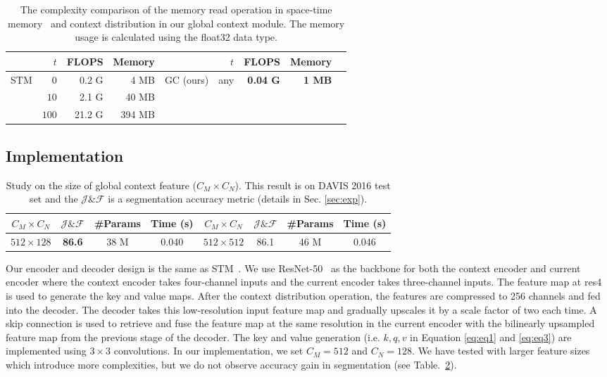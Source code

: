 \documentclass[runningheads]{llncs}
\begin{document}
\begin{table}[tb]
    \centering
    \caption{The complexity comparison of the memory read operation in space-time memory~\cite{stm} and context distribution in our global context module. The memory usage is calculated using the float32 data type.}
    \label{tab:complexity}
     \setlength{\tabcolsep}{6pt}
    \begin{tabular}{crrr|crrrr}
        \toprule
            & $t$ & FLOPS & Memory& & $t$ & FLOPS & Memory\\ 
        \midrule
        STM & $0$ & 0.2 G & 4 MB & GC (ours) & any & \textbf{0.04 G} & \textbf{1 MB} \\
         & $10$ & 2.1 G & 40 MB \\
         & $100$ & 21.2 G & 394 MB \\ 
        \bottomrule
    \end{tabular}
\end{table}

\subsection{Implementation}

\begin{table}[tb]
    \centering
    \caption{Study on the size of global context feature ($C_M \times C_N$). This result is on DAVIS 2016 test set and the $\mathcal{J} \& \mathcal{F}$ is a segmentation accuracy metric (details in Sec. \ref{sec:exp}).}
    \label{tab:ablation}
    \setlength{\tabcolsep}{3pt}
    \begin{tabular}{cccc|cccc}
        \toprule
        $C_M \times C_N$ & $\mathcal{J} \& \mathcal{F}$ & \#Params & Time (s) & $C_M \times C_N$ & $\mathcal{J} \& \mathcal{F}$ & \#Params & Time (s)\\ \midrule
        $512 \times 128$ & \textbf{86.6} & 38 M & 0.040 & $512 \times 512$ & 86.1 & 46 M & 0.046 \\ \bottomrule
    \end{tabular}
\end{table}

Our encoder and decoder design is the same as STM~\cite{stm}. We use ResNet-50~\cite{resnet} as the backbone for both the context encoder and current encoder where the context encoder takes four-channel inputs and the current encoder takes three-channel inputs. The feature map at res4 is used to generate the key and value maps. After the context distribution operation, the features are compressed to 256 channels and fed into the decoder. The decoder takes this low-resolution input feature map and gradually upscales it by a scale factor of two each time. A skip connection is used to retrieve and fuse the feature map at the same resolution in the current encoder with the bilinearly upsampled feature map from the previous stage of the decoder.
The key and value generation (i.e. $k, q, v$ in Equation \eqref{eq:eq1} and \eqref{eq:eq3}) are implemented using $3 \times 3$ convolutions. In our implementation, we set $C_M = 512$ and $C_N = 128$. We have tested with larger feature sizes which introduce more complexities, but we do not observe accuracy gain in segmentation (see Table.~\ref{tab:ablation}).
\end{document}

